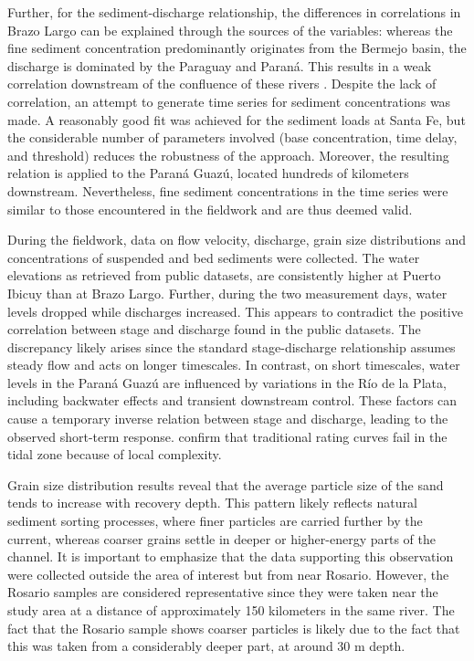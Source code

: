 Further, for the sediment-discharge relationship, the differences in correlations in Brazo Largo can be explained through the sources of the variables: whereas the fine sediment concentration predominantly originates from the Bermejo basin, the discharge is dominated by the Paraguay and Paraná. This results in a weak correlation downstream of the confluence of these rivers \autocite{lopezweibelSourcesTemporalDynamics2022}. Despite the lack of correlation, an attempt to generate time series for sediment concentrations was made. A reasonably good fit was achieved for the sediment loads at Santa Fe, but the considerable number of parameters involved (base concentration, time delay, and threshold) reduces the robustness of the approach. Moreover, the resulting relation is applied to the Paraná Guazú, located hundreds of kilometers downstream. Nevertheless, fine sediment concentrations in the time series were similar to those encountered in the fieldwork and are thus deemed valid.

During the fieldwork, data on flow velocity, discharge, grain size distributions and concentrations of suspended and bed sediments were collected. The water elevations as retrieved from public datasets, are consistently higher at Puerto Ibicuy than at Brazo Largo. Further, during the two measurement days, water levels dropped while discharges increased. This appears to contradict the positive correlation between stage and discharge found in the public datasets. The discrepancy likely arises since the standard stage-discharge relationship assumes steady flow and acts on longer timescales. In contrast, on short timescales, water levels in the Paraná Guazú are influenced by variations in the Río de la Plata, including backwater effects and transient downstream control. These factors can cause a temporary inverse relation between stage and discharge, leading to the observed short-term response. \textcite{jonesExpandedRatingCurve2019} confirm that traditional rating curves fail in the tidal zone because of local complexity.

Grain size distribution results reveal that the average particle size of the sand tends to increase with recovery depth. This pattern likely reflects natural sediment sorting processes, where finer particles are carried further by the current, whereas coarser grains settle in deeper or higher-energy parts of the channel. It is important to emphasize that the data supporting this observation were collected outside the area of interest but from near Rosario. However, the Rosario samples are considered representative since they were taken near the study area at a distance of approximately 150 kilometers in the same river. The fact that the Rosario sample shows coarser particles is likely due to the fact that this was taken from a considerably deeper part, at around 30 m depth. 

